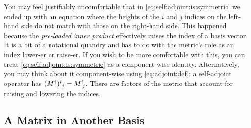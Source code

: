 \documentclass[12pt, oneside]{report}    %
\let\oldsection\section
\def\section{%
  \setcounter{sidenote}{1}%
  \oldsection
}
\begin{document}
You may feel justifiably uncomfortable that in \eqref{eq:self:adjoint:is:symmetric} we ended up with an equation where the heights of the $i$ and $j$ indices on the left-hand side do not match with those on the right-hand side. This happened because the \emph{pre-loaded inner product} effectively raises the index of a basis vector. It is a bit of a notational quandry and has to do with the metric's role as an index lower-er or raise-er. If you wish to be more comfortable with this, you can treat \eqref{eq:self:adjoint:is:symmetric} as a component-wise identity. Alternatively, you may think about it component-wise using \eqref{eq:adjoint:def}: a self-adjoint operator has $(M^\dag)\aij{i}{j} = M\aij{i}{j}$. There are factors of the metric that account for raising and lowering the indices.


\begin{subappendices}

\section{A Matrix in Another Basis}


\end{subappendices}
\end{document}
